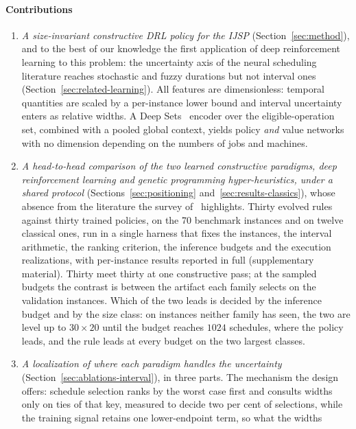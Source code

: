 \documentclass[preprint,authoryear,12pt]{elsarticle}
\theoremstyle{definition}
\theoremstyle{remark}
\begin{document}
\paragraph{Contributions}
\begin{enumerate}
\item \emph{A size-invariant constructive DRL policy for the
  IJSP} (Section~\ref{sec:method}), and to the best of our knowledge
  the first application of deep reinforcement learning to this
  problem: the uncertainty axis of the neural scheduling literature
  reaches stochastic and fuzzy durations but not interval ones
  (Section~\ref{sec:related-learning}). All features are dimensionless:
  temporal quantities are scaled by a per-instance lower bound and
  interval uncertainty enters as relative widths. A Deep
  Sets~\citep{Zaheer2017} encoder over the eligible-operation set,
  combined with a pooled global context, yields policy \emph{and}
  value networks with no dimension depending on the numbers of jobs
  and machines.
\item \emph{A head-to-head comparison of the two learned constructive
  paradigms, deep reinforcement learning and genetic programming
  hyper-heuristics, under a shared protocol}
  (Sections~\ref{sec:positioning} and~\ref{sec:results-classics}),
  whose absence from the literature the survey of~\citet{Xu2025}
  highlights. Thirty evolved rules against thirty trained policies,
  on the 70 benchmark instances and on twelve classical ones, run in
  a single harness that fixes the instances, the interval arithmetic,
  the ranking criterion, the inference budgets and the execution
  realizations, with per-instance results reported in full
  (supplementary material). Thirty meet thirty at one constructive
  pass; at the sampled budgets the contrast is between the artifact
  each family selects on the validation instances. Which of the two
  leads is decided by the inference budget and by the size class: on
  instances neither family has seen, the two are level up to
  $30{\times}20$ until the budget reaches $1024$ schedules, where the
  policy leads, and the rule leads at every budget on the two
  largest classes.
\item \emph{A localization of where each paradigm handles the
  uncertainty} (Section~\ref{sec:ablations-interval}), in three
  parts. The mechanism the design offers: schedule selection ranks
  by the worst case first and consults widths only on ties of that
  key, measured to decide two per cent of selections, while the
  training signal retains one lower-endpoint term, so what the widths

\end{enumerate}
\end{document}
